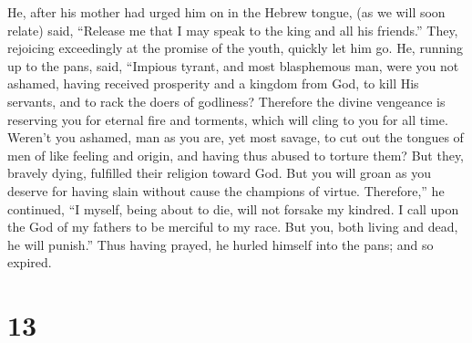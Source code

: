  He, after his mother had urged him on in the Hebrew
tongue, (as we will soon relate) said,  ``Release me that
I may speak to the king and all his friends.''  They,
rejoicing exceedingly at the promise of the youth, quickly let him go.
 He, running up to the pans, said, 
``Impious tyrant, and most blasphemous man, were you not ashamed, having
received prosperity and a kingdom from God, to kill His servants, and to
rack the doers of godliness?  Therefore the divine
vengeance is reserving you for eternal fire and torments, which will
cling to you for all time.  Weren't you ashamed, man as
you are, yet most savage, to cut out the tongues of men of like feeling
and origin, and having thus abused to torture them?  But
they, bravely dying, fulfilled their religion toward God.
 But you will groan as you deserve for having slain
without cause the champions of virtue.  Therefore,'' he
continued, ``I myself, being about to die,  will not
forsake my kindred.  I call upon the God of my fathers to
be merciful to my race.  But you, both living and dead,
he will punish.''  Thus having prayed, he hurled himself
into the pans; and so expired.

\hypertarget{section-12}{%
\section{13}\label{section-12}}

